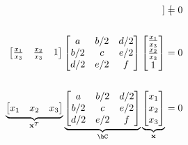 \begin{problem}
\begin{enumalph}
\begin{answer}
\begin{align*}
\begin{bmatrix}
          \end{bmatrix} &= 0 \\ \\
          \begin{bmatrix}
            \frac{x_1}{x_3} & \frac{x_2}{x_3} & 1 \\
          \end{bmatrix}
          \begin{bmatrix}
            a & b/2 & d/2 \\
            b/2 & c & e/2 \\
            d/2 & e/2 & f \\
          \end{bmatrix}
          \begin{bmatrix}
            \frac{x_1}{x_3} \\
            \frac{x_2}{x_3} \\
            1 \\
          \end{bmatrix}
          &= 0 \\ \\
          \underbrace{\begin{bmatrix}
            x_1 & x_2 & x_3 \\
          \end{bmatrix}}_{\bx^T}
          \underbrace{\begin{bmatrix}
            a & b/2 & d/2 \\
            b/2 & c & e/2 \\
            d/2 & e/2 & f \\
          \end{bmatrix}}_{\bC}
          \underbrace{\begin{bmatrix}
            x_1 \\
            x_2 \\
            x_3 \\
          \end{bmatrix}}_{\bx}
          &= 0
        \end{align*}
      \end{answer}


\end{enumalph}
\end{problem}
